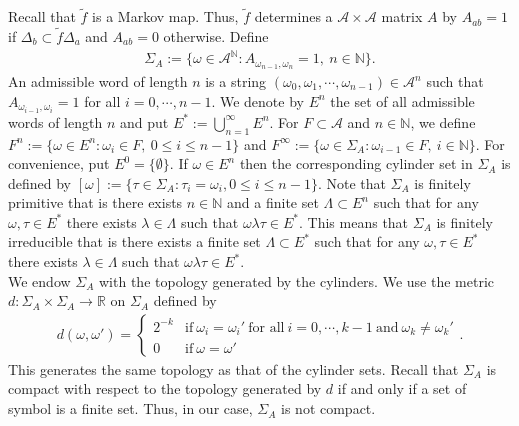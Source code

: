 \documentclass{article}
\theoremstyle{definition}
\begin{document}
Recall that $\tilde f $ is a Markov map. Thus, $\tilde f $ determines a $\mathcal{A}\times \mathcal{A}$ matrix $A$ by $A_{ab}=1$ if $\Delta_b\subset\tilde f \Delta_a$ and $A_{ab}=0$ otherwise. Define
\begin{align}
    \Sigma_A:=\lbrace \omega \in \mathcal{A}^{\mathbb{N}}:A_{\omega_{n-1},\omega_{n}}=1,\ n\in \mathbb{N} \rbrace\nonumber.
\end{align}
An admissible word of length $n$ is a string $(\omega_0,\omega_1,\cdots,\omega_{n-1})\in\mathcal{A}^n$ such that $A_{\omega_{i-1},\omega_{i}}=1$ for all $i=0,\cdots,n-1$. We denote by $E^n$ the set of all admissible words of length $n$ and put $E^*:=\bigcup_{n=1}^{\infty}E^n$. For $F\subset\mathcal{A}$ and $n\in\mathbb{N}$, we define $F^n:=\lbrace\omega\in E^n:\omega_i\in F,\  0\leq i\leq n-1\rbrace$ and $F^\infty:=\lbrace\omega\in \Sigma_A:\omega_{i-1}\in F,\ i\in\mathbb{N}\rbrace$. For convenience, put $E^0=\lbrace \emptyset \rbrace$. If $\omega \in E^n$ then the corresponding cylinder set in $\Sigma_A$ is defined by $[\omega]:=\lbrace \tau \in \Sigma_A:\tau_i=\omega_i, 0\leq i\leq n-1\rbrace$. Note that  $\Sigma_A$ is finitely primitive that is there exists $n\in\mathbb{N}$ and a finite set $\Lambda\subset E^n$ such that for any $\omega, \tau\in E^*$ there exists $\lambda\in\Lambda$ such that $\omega\lambda\tau\in E^*$. This means that $\Sigma_A$ is finitely irreducible that is there exists a finite set $\Lambda\subset E^*$ such that for any $\omega, \tau\in E^*$ there exists $\lambda\in\Lambda$ such that $\omega\lambda\tau\in E^*$. \\
We endow $\Sigma_A$ with the topology generated by the cylinders. We use the metric $d:\Sigma_A\times\Sigma_A\rightarrow \mathbb{R}$ on $\Sigma_A$ defined by 
\begin{align}\label{eq: metric}
     d(\omega,\omega')= \left\{
 \begin{array}{cc}
   {2^{-k}}   & \text{if}\  \omega_i=\omega_i'\ \text{for\ all}\ i=0,\cdots,k-1\ \text{and}\ \omega_{k}\neq\omega_{k}'\\
   0   & \text{if}\ \omega=\omega'
 \end{array}
 \right. .
\end{align}
This generates the same topology as that of the cylinder sets. Recall that $\Sigma_A$ is compact with respect to the topology generated by $d$ if and only if a set of symbol is a finite set. Thus, in our case, $\Sigma_A$ is not compact.
\end{document}
